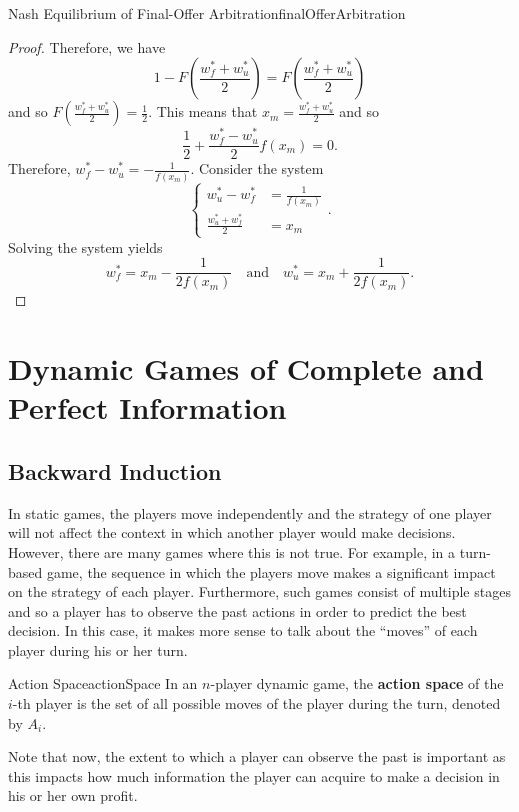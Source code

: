 \documentclass[math]{amznotes}
\theoremstyle{remark}
\begin{document}
\begin{probox}{Nash Equilibrium of Final-Offer Arbitration}{finalOfferArbitration}
\begin{proof}
        Therefore, we have 
        \begin{equation*}
            1 - F\left(\frac{w_f^* + w_u^*}{2}\right) = F\left(\frac{w_f^* + w_u^*}{2}\right)            
        \end{equation*}
        and so $F\left(\frac{w_f^* + w_u^*}{2}\right) = \frac{1}{2}$. This means that $x_m = \frac{w_f^* + w_u^*}{2}$ and so 
        \begin{equation*}
            \frac{1}{2} + \frac{w_f^* - w_u^*}{2}f\left(x_m\right) = 0.
        \end{equation*}
        Therefore, $w_f^* - w_u^* = -\frac{1}{f\left(x_m\right)}$. Consider the system
        \begin{equation*}
            \begin{cases}
                w_u^* - w_f^* & = \frac{1}{f\left(x_m\right)} \\
                \frac{w_u^* + w_f^*}{2} & = x_m
            \end{cases}.
        \end{equation*}
        Solving the system yields
        \begin{equation*}
            w_f^* = x_m - \frac{1}{2f\left(x_m\right)} \quad\textrm{and}\quad w_u^* = x_m + \frac{1}{2f\left(x_m\right)}.
        \end{equation*}
    \end{proof}
\end{probox}
\section{Dynamic Games of Complete and Perfect Information}
\subsection{Backward Induction}
In static games, the players move independently and the strategy of one player will not affect the context in which another player would make decisions. However, there are many games where this is not true. For example, in a turn-based game, the sequence in which the players move makes a significant impact on the strategy of each player. Furthermore, such games consist of multiple stages and so a player has to observe the past actions in order to predict the best decision. In this case, it makes more sense to talk about the ``moves'' of each player during his or her turn.
\begin{dfnbox}{Action Space}{actionSpace}
    In an $n$-player dynamic game, the {\color{red} \textbf{action space}} of the $i$-th player is the set of all possible moves of the player during the turn, denoted by $A_i$.
\end{dfnbox}
Note that now, the extent to which a player can observe the past is important as this impacts how much information the player can acquire to make a decision in his or her own profit.
\end{document}
